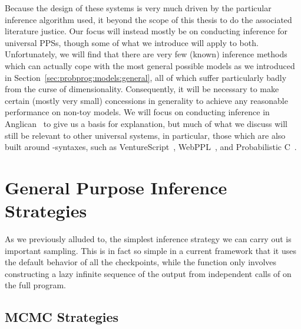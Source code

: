 Because the design of these systems is very much driven by the particular inference algorithm used, it
beyond the scope of this thesis to do the associated literature justice.  Our focus will instead mostly be on 
conducting inference for universal PPSs, though some of what we introduce will apply to both.
Unfortunately, we will find that there are very few (known) inference
methods which can actually cope with the most general possible models as we introduced in
Section~\ref{sec:probprog:models:general}, all of which suffer particularly badly from the curse of
dimensionality.  Consequently, it will be necessary to make certain (mostly very small) concessions in 
generality to achieve any reasonable performance on non-toy models.  We will focus on conducting
inference in Anglican~\citep{wood2014new,tolpin2016design} to give us a basis for explanation, but much of
what we discuss will still be relevant to other universal systems, in particular, those which
are also built around \sample-\observe syntaxes, such as VentureScript~\citep{mansinghka2014venture}, 
WebPPL~\citep{goodman_book_2014}, and Probabilistic C~\citep{paige2014compilation}.





\section{General Purpose Inference Strategies}
\label{sec:proginf:str}


As we previously alluded to, the simplest inference strategy we can carry out is important
sampling.  This is in fact so simple in a current framework that it uses the default behavior
of all the checkpoints, while the \anginfer function only involves constructing a lazy infinite
sequence of the output from independent calls of  on the full program.

\subsection{MCMC Strategies}
\label{sec:proginf:str:lmh}

